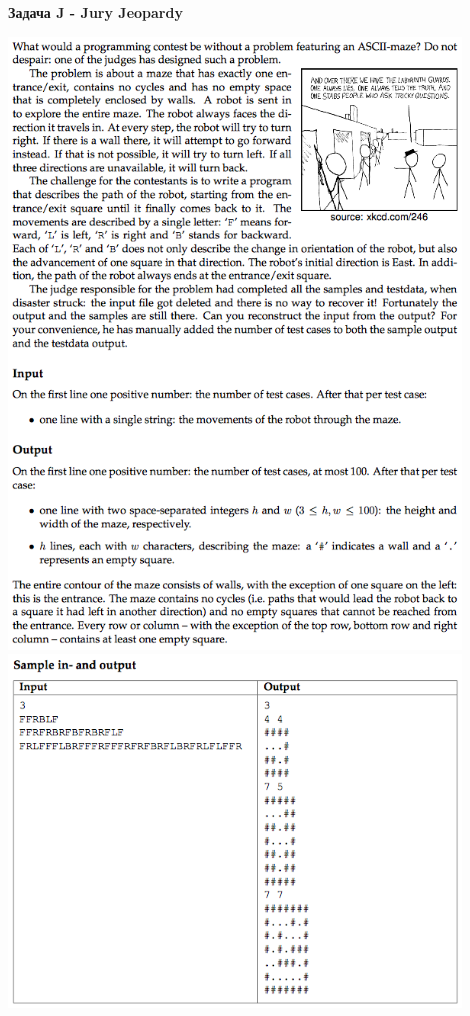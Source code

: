 \documentclass[a4paper,12pt]{article}
\begin{document}
\newpage
\textbf{{\large Задача J - Jury Jeopardy}} \\
\begin{center}
\includegraphics[width=0.9\textwidth]{CT_S02E08/CT_S02E08_J1.png}\\ [1cm]
\includegraphics[width=0.9\textwidth]{CT_S02E08/CT_S02E08_J2.png}\\ [1cm]
\end{center}
\end{document}
